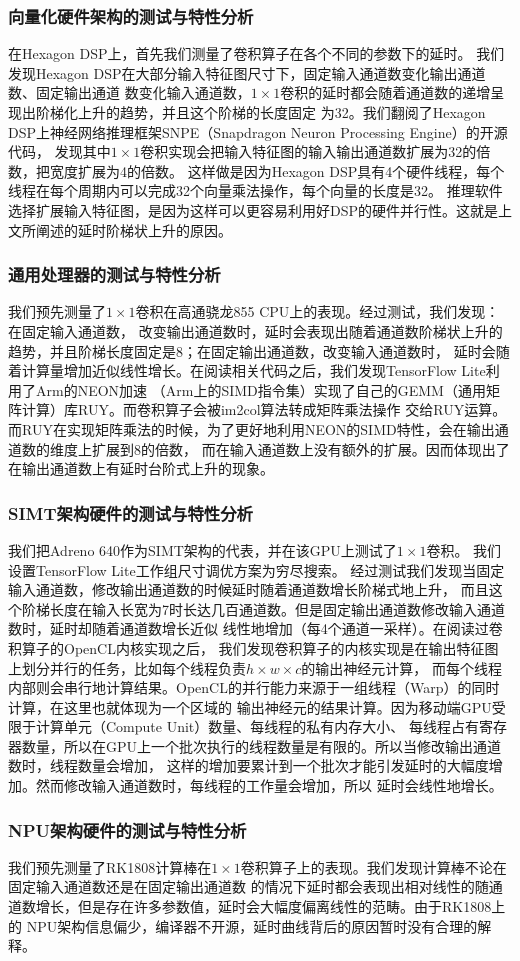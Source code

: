 \subsubsection{向量化硬件架构的测试与特性分析}
在Hexagon DSP上，首先我们测量了卷积算子在各个不同的参数下的延时。
我们发现Hexagon DSP在大部分输入特征图尺寸下，固定输入通道数变化输出通道数、固定输出通道
数变化输入通道数，$1\times 1$卷积的延时都会随着通道数的递增呈现出阶梯化上升的趋势，并且这个阶梯的长度固定
为32。我们翻阅了Hexagon DSP上神经网络推理框架SNPE（Snapdragon Neuron Processing Engine）的开源代码，
发现其中$1\times 1$卷积实现会把输入特征图的输入输出通道数扩展为32的倍数，把宽度扩展为4的倍数。
这样做是因为Hexagon DSP具有4个硬件线程，每个线程在每个周期内可以完成32个向量乘法操作，每个向量的长度是32。
推理软件选择扩展输入特征图，是因为这样可以更容易利用好DSP的硬件并行性。这就是上文所阐述的延时阶梯状上升的原因。

\subsubsection{通用处理器的测试与特性分析}
我们预先测量了$1\times 1$卷积在高通骁龙855 CPU上的表现。经过测试，我们发现：在固定输入通道数，
改变输出通道数时，延时会表现出随着通道数阶梯状上升的趋势，并且阶梯长度固定是8；在固定输出通道数，改变输入通道数时，
延时会随着计算量增加近似线性增长。在阅读相关代码之后，我们发现TensorFlow Lite利用了Arm的NEON加速
（Arm上的SIMD指令集）实现了自己的GEMM（通用矩阵计算）库RUY。而卷积算子会被im2col算法转成矩阵乘法操作
交给RUY运算。而RUY在实现矩阵乘法的时候，为了更好地利用NEON的SIMD特性，会在输出通道数的维度上扩展到8的倍数，
而在输入通道数上没有额外的扩展。因而体现出了在输出通道数上有延时台阶式上升的现象。

\subsubsection{SIMT架构硬件的测试与特性分析}
我们把Adreno 640作为SIMT架构的代表，并在该GPU上测试了$1\times 1$卷积。
我们设置TensorFlow Lite工作组尺寸调优方案为穷尽搜索。
经过测试我们发现当固定输入通道数，修改输出通道数的时候延时随着通道数增长阶梯式地上升，
而且这个阶梯长度在输入长宽为7时长达几百通道数。但是固定输出通道数修改输入通道数时，延时却随着通道数增长近似
线性地增加（每4个通道一采样）。在阅读过卷积算子的OpenCL内核实现之后，
我们发现卷积算子的内核实现是在输出特征图上划分并行的任务，比如每个线程负责$h\times w\times c$的输出神经元计算，
而每个线程内部则会串行地计算结果。OpenCL的并行能力来源于一组线程（Warp）的同时计算，在这里也就体现为一个区域的
输出神经元的结果计算。因为移动端GPU受限于计算单元（Compute Unit）数量、每线程的私有内存大小、
每线程占有寄存器数量，所以在GPU上一个批次执行的线程数量是有限的。所以当修改输出通道数时，线程数量会增加，
这样的增加要累计到一个批次才能引发延时的大幅度增加。然而修改输入通道数时，每线程的工作量会增加，所以
延时会线性地增长。

\subsubsection{NPU架构硬件的测试与特性分析}
我们预先测量了RK1808计算棒在$1\times 1$卷积算子上的表现。我们发现计算棒不论在固定输入通道数还是在固定输出通道数
的情况下延时都会表现出相对线性的随通道数增长，但是存在许多参数值，延时会大幅度偏离线性的范畴。由于RK1808上的
NPU架构信息偏少，编译器不开源，延时曲线背后的原因暂时没有合理的解释。